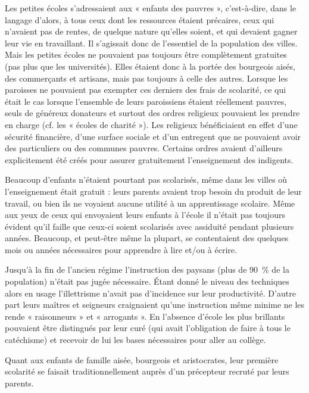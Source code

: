  Les petites écoles s'adressaient aux « enfants des pauvres », c'est-à-dire, dans le langage d'alors, à tous ceux dont les ressources étaient précaires, ceux qui n'avaient pas de rentes, de quelque nature qu'elles soient, et qui devaient gagner leur vie en travaillant. Il s'agissait donc de l'essentiel de la population des villes. Mais les petites écoles ne pouvaient pas toujours être complètement gratuites (pas plus que les universités). Elles étaient donc à la portée des bourgeois aisés, des commerçants et artisans, mais pas toujours à celle des autres. Lorsque les paroisses ne pouvaient pas exempter ces derniers des frais de scolarité, ce qui était le cas lorsque l'ensemble de leurs paroissiens étaient réellement pauvres, seuls de généreux donateurs et surtout des ordres religieux pouvaient les prendre en charge (cf.  les « écoles de charité »). Les religieux bénéficiaient en effet d'une sécurité financière, d'une surface sociale et d'un entregent que ne pouvaient avoir des particuliers ou des communes pauvres. Certains ordres avaient d'ailleurs explicitement été créés pour assurer gratuitement l'enseignement des indigents.

Beaucoup d'enfants n'étaient pourtant pas scolarisés, même dans les villes où l'enseignement était gratuit : leurs parents avaient trop besoin du produit de leur travail, ou bien ils ne voyaient aucune utilité à un apprentissage scolaire. Même aux yeux de ceux qui envoyaient leurs enfants à l'école il n'était pas toujours évident qu'il faille que ceux-ci soient scolarisés avec assiduité pendant plusieurs années. Beaucoup, et peut-être même la plupart, se contentaient des quelques mois ou années nécessaires pour apprendre à lire et/ou à écrire. 



 Jusqu'à la fin de l'ancien régime l'instruction des paysans (plus de 90~\% de la population) n'était pas jugée nécessaire. Étant donné le niveau des techniques alors en usage l'illettrisme n'avait pas d'incidence sur leur productivité. D'autre part leurs maîtres et seigneurs craignaient qu'une instruction même minime ne les rende « raisonneurs » et « arrogants ». En l'absence d'école les plus brillants pouvaient être distingués par leur curé (qui avait l'obligation de faire à tous le catéchisme) et recevoir de lui les bases nécessaires pour aller au collège.

Quant aux enfants de famille aisée, bourgeois et aristocrates, leur première scolarité se faisait traditionnellement auprès d'un précepteur recruté par leurs parents.  

